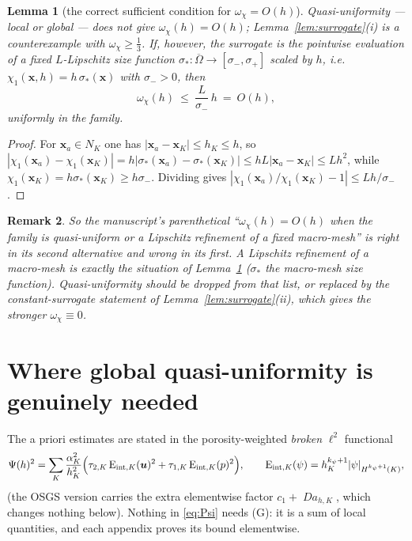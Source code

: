\documentclass[11pt,a4paper]{article}
\newtheorem{lemma}{Lemma}
\newtheorem{remark}[lemma]{Remark}
\theoremstyle{definition}
\newcommand{\bu}{\boldsymbol{u}}
\newcommand{\bx}{\boldsymbol{x}}
\newcommand{\Eint}[2]{\mathrm{E}_{\mathrm{int},#1}(#2)}
\newcommand{\Damk}{\operatorname{\mathit{Da}}}
\begin{document}
\begin{lemma}[the correct sufficient condition for $\omega_\chi=O(h)$]\label{lem:omegah}
Quasi-uniformity --- local or global --- does not give $\omega_\chi(h)=O(h)$; Lemma~\ref{lem:surrogate}(i)
is a counterexample with $\omega_\chi\ge\tfrac13$. If, however, the surrogate is the pointwise
evaluation of a fixed $L$-Lipschitz size function $\sigma_{\!*}:\overline\Omega\to[\sigma_-,\sigma_+]$
scaled by $h$, i.e.\ $\chi_1(\bx,h)=h\,\sigma_{\!*}(\bx)$ with $\sigma_-\!>0$, then
\begin{equation}\label{eq:omegaLip}
  \omega_\chi(h)\ \le\ \frac{L}{\sigma_-}\,h\ =\ O(h),
\end{equation}
uniformly in the family.
\end{lemma}

\begin{proof}
For $\bx_a\in N_K$ one has $|\bx_a-\bx_K|\le h_K\le h$, so
$|\chi_1(\bx_a)-\chi_1(\bx_K)|=h|\sigma_{\!*}(\bx_a)-\sigma_{\!*}(\bx_K)|\le hL|\bx_a-\bx_K|\le Lh^2$,
while $\chi_1(\bx_K)=h\sigma_{\!*}(\bx_K)\ge h\sigma_-$. Dividing gives
$|\chi_1(\bx_a)/\chi_1(\bx_K)-1|\le Lh/\sigma_-$.
\end{proof}

\begin{remark}
So the manuscript's parenthetical ``$\omega_\chi(h)=O(h)$ when the family is quasi-uniform or a
Lipschitz refinement of a fixed macro-mesh'' is right in its second alternative and wrong in its
first. A Lipschitz refinement of a macro-mesh is exactly the situation of
Lemma~\ref{lem:omegah} ($\sigma_{\!*}$ the macro-mesh size function). Quasi-uniformity should be
dropped from that list, or replaced by the constant-surrogate statement of
Lemma~\ref{lem:surrogate}(ii), which gives the stronger $\omega_\chi\equiv0$.
\end{remark}

\section{Where global quasi-uniformity is genuinely needed}

The a priori estimates are stated in the porosity-weighted \emph{broken} $\ell^2$ functional
\begin{equation}\label{eq:Psi}
  \Psi(h)^2=\sum_{K}\frac{\alpha_K^2}{h_K^2}
  \Bigl(\tau_{2,K}\,\Eint{K}{\bu}^2+\tau_{1,K}\,\Eint{K}{p}^2\Bigr),
  \qquad \Eint{K}{\psi}=h_K^{k_\psi+1}\lvert\psi\rvert_{H^{k_\psi+1}(K)} ,
\end{equation}
(the OSGS version carries the extra elementwise factor $c_1+\Damk_{h,K}$, which changes nothing
below). Nothing in \eqref{eq:Psi} needs (G): it is a sum of local quantities, and each appendix
proves its bound elementwise.
\end{document}
